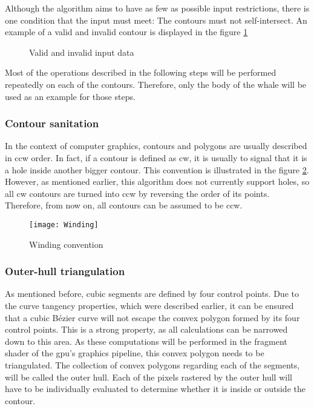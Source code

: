 \documentclass[\topdir/main.tex]{subfiles}
\begin{document}
Although the algorithm aims to have as few as possible input restrictions, there is one condition that the input must meet: The contours must not self-intersect. An example of a valid and invalid contour is displayed in the figure \ref{fig:valid}\newline

\begin{figure}[hbtp]
    \centering

    \caption{Valid and invalid input data}
    \label{fig:valid}
\end{figure}

Most of the operations described in the following steps will be performed repeatedly on each of the contours. Therefore, only the body of the whale will be used as an example for those steps.\newline

\subsubsection{Contour sanitation}
In the context of computer graphics, contours and polygons are usually described in \gls{ccw} order. In fact, if a contour is defined as \gls{cw}, it is usually to signal that it is a hole inside another bigger contour. This convention is illustrated in the figure \ref{fig:winding}. However, as mentioned earlier, this algorithm does not currently support holes, so all \gls{cw} contours are turned into \gls{ccw} by reversing the order of its points. Therefore, from now on, all contours can be assumed to be \gls{ccw}.\newline

\begin{figure}[hbtp]
    \centering
    \texttt{[image: Winding]}

    \caption{Winding convention}
    \label{fig:winding}
\end{figure}


\subsubsection{Outer-hull triangulation}
As mentioned before, cubic segments are defined by four control points. Due to the curve tangency properties, which were described earlier, it can be ensured that a cubic Bézier curve will not escape the convex polygon formed by its four control points. This is a strong property, as all calculations can be narrowed down to this area. As these computations will be performed in the fragment shader of the \gls{gpu}'s graphics pipeline, this convex polygon needs to be triangulated. The collection of convex polygons regarding each of the segments, will be called the outer hull. Each of the pixels rastered by the outer hull will have to be individually evaluated to determine whether it is inside or outside the contour.\newline 
\end{document}
